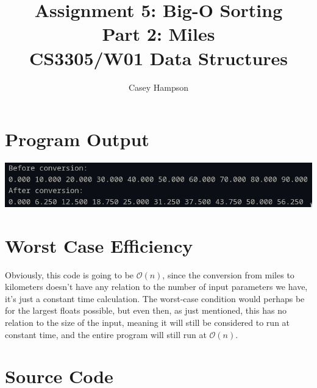 \documentclass{article}
\title{Assignment 5: Big-O Sorting \\[5pt] Part 2: Miles \\[8pt] CS3305/W01 Data Structures}
\author{Casey Hampson}
\begin{document}
\maketitle


\section*{Program Output}

\begin{center}
\includegraphics[width=0.9\linewidth]{res/1.png}
\end{center}

\section*{Worst Case Efficiency}
Obviously, this code is going to be $\mathcal{O}(n)$, since the conversion from miles to kilometers doesn't have any relation to the number of input parameters we have, it's just a constant time calculation. The worst-case condition would perhaps be for the largest floats possible, but even then, as just mentioned, this has no relation to the size of the input, meaning it will still be considered to run at constant time, and the entire program will still run at $\mathcal{O}(n)$. 


\pagebreak
\section*{Source Code}
\inputminted{java}{./P2.java}
\end{document}
